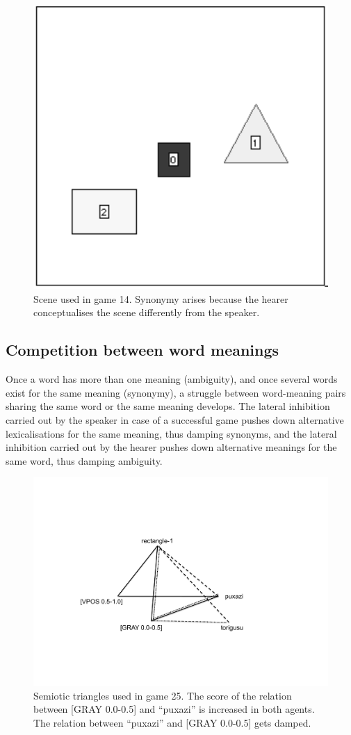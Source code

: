 \begin{figure}[htbp]
  \centerline{\includegraphics[width=.40\textwidth]{chap6/figs/scene-game14}}
\caption{\label{scene-game14} Scene used
in game 14. Synonymy arises because the hearer conceptualises
the scene differently from the speaker.}
\end{figure}

\subsection{Competition between word meanings }

Once a word has more than one meaning (ambiguity), 
and once several words exist for the same meaning 
(synonymy), a struggle between word-meaning
pairs sharing the same word or the 
same meaning develops. The lateral inhibition carried out by the 
speaker in case of a successful game pushes
down alternative lexicalisations for the same meaning, 
thus damping synonyms, and the lateral inhibition carried out 
by the hearer pushes down alternative meanings for the 
same word, thus damping ambiguity. 


\begin{figure}[htbp]
  \centerline{\includegraphics[width=.60\textwidth]{chap6/figs/triangle5}}
\caption{\label{triangle5} Semiotic triangles used 
in game 25. The score of the relation between [GRAY 0.0-0.5] and 
``puxazi'' is increased in both agents. The relation between ``puxazi'' and 
{}[GRAY 0.0-0.5] gets damped.}
\end{figure}

